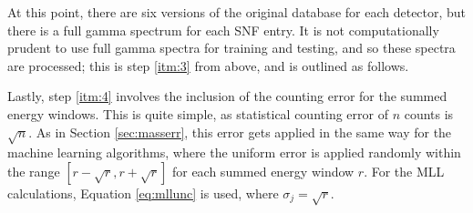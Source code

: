 At this point, there are six versions of the original database for each
detector, but there is a full gamma spectrum for each \gls{SNF} entry. It is
not computationally prudent to use full gamma spectra for training and testing,
and so these spectra are processed; this is step \ref{itm:3} from above, and is
outlined as follows.

Lastly, step \ref{itm:4} involves the inclusion of the counting error for the
summed energy windows. This is quite simple, as statistical counting error of
$n$ counts is $\sqrt{n}$.  As in Section \ref{sec:masserr}, this error gets
applied in the same way for the machine learning algorithms, where the uniform
error is applied randomly within the range $[r-\sqrt{r},r+\sqrt{r}]$ for each
summed energy window $r$. For the \gls{MLL} calculations, Equation
\ref{eq:mllunc} is used, where $\sigma_{j} = \sqrt{r}$.
